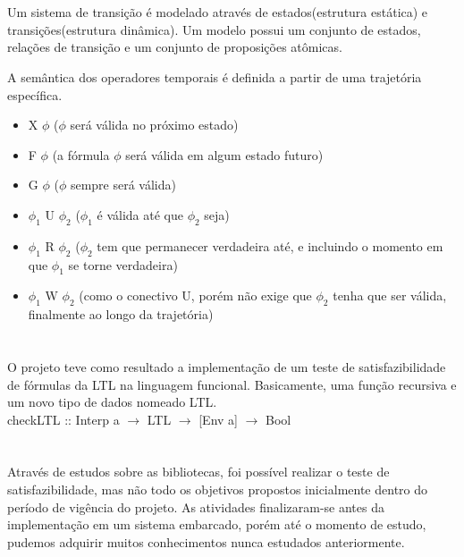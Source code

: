 \documentclass{sciposter}
\newcommand{\tituloA}[1]{\Large{\emph{\textbf{\color{white}{#1}}}}}
\begin{document}
\begin{multicols}{3}
{\section*{\tituloA{Semântica da Lógica Temporal}}

Um sistema de transição é modelado através de estados(estrutura estática) e transições(estrutura dinâmica). Um modelo possui um conjunto de estados, relações de transição e um conjunto de proposições atômicas.
\par A semântica dos operadores temporais é definida a partir de uma trajetória específica.
\begin{itemize}
	\item X $\phi$ ($\phi$ será válida no próximo estado)
	\item F $\phi$ (a fórmula $\phi$ será válida em algum estado futuro)
	\item G $\phi$ ($\phi$ sempre será válida)
	\item $\phi _{1}$ U $\phi _{2}$ ($\phi _{1}$ é válida até que $\phi _{2}$ seja)
	\item $\phi _{1}$ R $\phi _{2}$ ($\phi _{2}$ tem que permanecer verdadeira até, e incluindo o momento em que $\phi _{1}$ se torne verdadeira)
	\item $\phi _{1}$ W $\phi _{2}$ (como o conectivo U, porém não exige que $\phi _{2}$ tenha que ser válida, finalmente ao longo da trajetória) 
\end{itemize}

\section*{\tituloA{Resultados Obtidos}}
O projeto teve como resultado a implementação de um teste de satisfazibilidade de fórmulas da LTL na linguagem funcional. Basicamente, uma função recursiva e um novo tipo de dados nomeado LTL.\\
checkLTL :: Interp a $\rightarrow $ LTL $\rightarrow $ [Env a] $\rightarrow $ Bool	

\section*{\tituloA{Conclusões}}
Através de estudos sobre as bibliotecas, foi possível realizar o teste de satisfazibilidade, mas não todo os objetivos propostos inicialmente dentro do período de vigência do projeto. As atividades finalizaram-se antes da implementação em um sistema embarcado, porém até o momento de estudo, pudemos adquirir muitos conhecimentos nunca estudados anteriormente.

  \section*{\tituloA{Referências}}
  \renewcommand{\section}[2]{}
  
  

  }\end{multicols}
\end{document}

